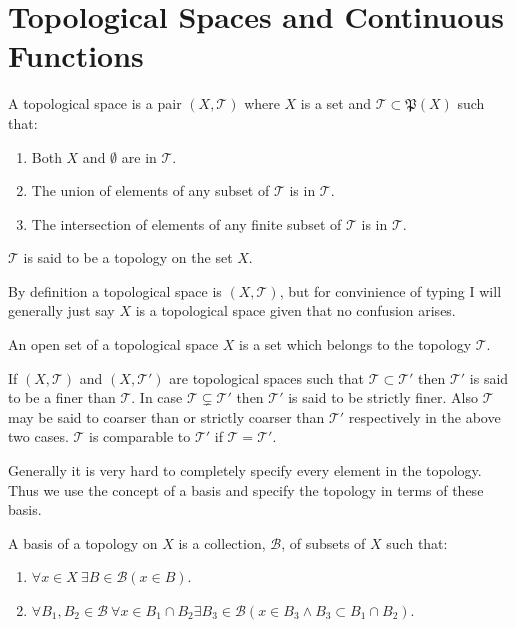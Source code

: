 \section{Topological Spaces and Continuous Functions}
\begin{definition}
  A topological space is a pair $(X, \mathscr{T})$ where $X$ is a set and $ \mathscr{T}\subset \mathfrak{P} (X)$ such that:
  \begin{enumerate}
    \item Both $X$ and $\emptyset$ are in $ \mathscr{T}$.
    \item The union of elements of any subset of $ \mathscr{T}$ is in $ \mathscr{T}$.
    \item The intersection of elements of any finite subset of $ \mathscr{T}$ is in $ \mathscr{T}$.
  \end{enumerate}
  $ \mathscr{T}$ is said to be a topology on the set $X$.
\end{definition}
\begin{remark}
  By definition a topological space is $(X, \mathscr{T})$, but for convinience of typing I will generally just say $X$ is a topological space given that no confusion arises.
\end{remark}
\begin{definition}
  An open set of a topological space $X$ is a set which belongs to the topology $ \mathscr{T}$.
\end{definition}
\begin{definition}
  If $(X, \mathscr{T})$ and $(X, \mathscr{T}')$ are topological spaces such that $ \mathscr{T} \subset \mathscr{T}'$ then $ \mathscr{T}'$ is said to be a finer than $ \mathscr{T}$. In case $ \mathscr{T} \subsetneq \mathscr{T}'$ then $ \mathscr{T}'$ is said to be strictly finer. Also $ \mathscr{T}$ may be said to coarser than or strictly coarser than $ \mathscr{T}'$ respectively in the above two cases. $ \mathscr{T}$ is comparable to $ \mathscr{T'}$ if $ \mathscr{T} = \mathscr{T}'$.
\end{definition}
Generally it is very hard to completely specify every element in the topology. Thus we use the concept of a basis and specify the topology in terms of these basis.
\begin{definition}
  A basis of a topology on $X$ is a collection, $ \mathscr{B}$, of subsets of $X$ such that:
  \begin{enumerate}
    \item $\forall x\in X \ \exists B\in \mathscr{B} (x\in B)$.
    \item $\forall B_1,B_2 \in \mathscr{B}\ \forall x\in B_1\cap B_2\exists B_3 \in \mathscr{B} (x\in B_3 \land  B_3 \subset B_1\cap B_2)$.
  \end{enumerate}
\end{definition}

